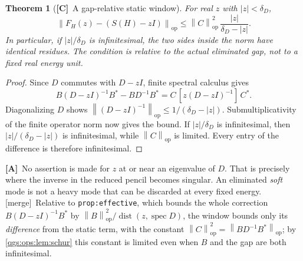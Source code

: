 \documentclass[11pt,oneside]{article}
\numberwithin{equation}{section}
\theoremstyle{plain}
\newtheorem{theorem}{Theorem}[section]
\theoremstyle{definition}
\theoremstyle{remark}
\newcommand{\op}{\mathrm{op}}
\newcommand{\abs}[1]{\left|#1\right|}
\newcommand{\norm}[1]{\left\|#1\right\|}
\newcommand{\TC}{\textcolor{TierC}{\textsf{\bfseries[C]}}}
\newcommand{\TA}{\textcolor{TierA}{\textsf{\bfseries[A]}}}
\newcommand{\merge}{{\small\textsf{[merge]}}}
\begin{document}
\begin{theorem}[\TC\ A gap-relative static window]\label{qgs:ops:thm:window}
For real $z$ with $\abs z<\delta_D$,
\begin{equation}\label{qgs:ops:eq:window-bound}
 \norm{F_H(z)-(S(H)-zI)}_\op
 \le \norm C_\op^2\,\frac{\abs z}{\delta_D-\abs z}.
\end{equation}
In particular, if $\abs z/\delta_D$ is infinitesimal, the two sides inside the norm have identical residues. The condition is relative to the actual eliminated gap, not to a fixed real energy unit.
\end{theorem}
\begin{proof}
Since $D$ commutes with $D-zI$, finite spectral calculus gives
\[
 B(D-zI)^{-1}B^*-BD^{-1}B^*
 =C\,[z(D-zI)^{-1}]\,C^*.
\]
Diagonalizing $D$ shows $\norm{(D-zI)^{-1}}_\op\le1/(\delta_D-\abs z)$. Submultiplicativity of the finite operator norm now gives the bound. If $\abs z/\delta_D$ is infinitesimal, then $\abs z/(\delta_D-\abs z)$ is infinitesimal, while $\norm C_\op$ is limited. Every entry of the difference is therefore infinitesimal.
\end{proof}

\TA\ No assertion is made for $z$ at or near an eigenvalue of $D$. That is precisely where the inverse in the reduced pencil becomes singular. An eliminated \emph{soft} mode is not a heavy mode that can be discarded at every fixed energy. \merge\ Relative to \texttt{prop:effective}, which bounds the whole correction $B(D-zI)^{-1}B^*$ by $\norm{B}_\op^2/\operatorname{dist}(z,\operatorname{spec}D)$, the window bounds only its \emph{difference} from the static term, with the constant $\norm C_\op^2=\norm{BD^{-1}B^*}_\op$; by \cref{qgs:ops:lem:schur} this constant is limited even when $B$ and the gap are both infinitesimal.
\end{document}
